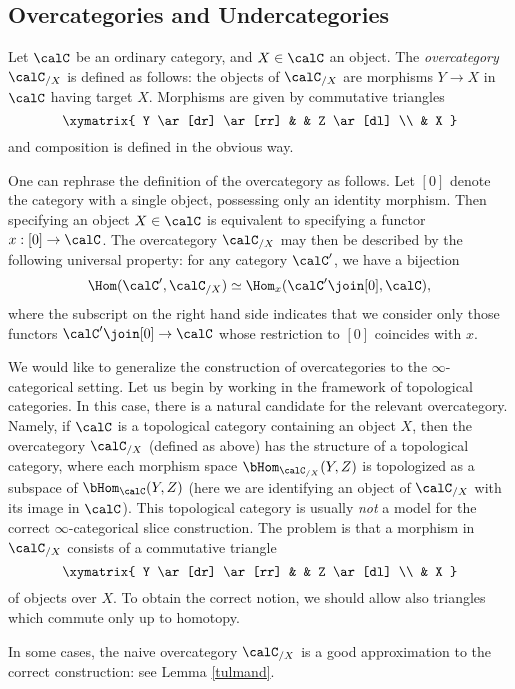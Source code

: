 \subsection{Overcategories and Undercategories}\label{slices}

Let $\calC$ be an ordinary category, and $X \in \calC$ an object.
The {\it overcategory} $\calC_{/X}$ is defined as follows:
the objects of $\calC_{/X}$ are
morphisms $Y \rightarrow X$ in $\calC$ having target $X$.
Morphisms are given by commutative triangles
$$\xymatrix{ Y \ar[dr] \ar[rr] & & Z \ar[dl] \\
& X }$$
and composition is defined in the obvious way.

One can rephrase the definition of the overcategory as follows.
Let $[0]$ denote the category with a single object, possessing
only an identity morphism. Then specifying an object $X \in \calC$
is equivalent to specifying a functor $x: [0] \rightarrow
\calC$. The overcategory $\calC_{/X}$ may then be described by
the following universal property: for any category $\calC'$, we
have a bijection
$$ \Hom(\calC', \calC_{/X}) \simeq \Hom_{x}(\calC' \join [0],
\calC),$$ where the subscript on the right hand side indicates
that we consider only those functors $\calC' \join [0]
\rightarrow \calC$ whose restriction to $[0]$ coincides with
$x$.

We would like to generalize the construction of overcategories to the $\infty$-categorical setting. 
Let us begin by working in the framework of topological categories. In this case, there is a natural candidate for the relevant overcategory. Namely, if $\calC$ is a topological category containing an object $X$, then the overcategory $\calC_{/X}$ (defined as above) has the structure of a topological category, where each morphism space $\bHom_{ \calC_{/X} }(Y,Z)$ is topologized as a subspace
of $\bHom_{\calC}(Y,Z)$ (here we are identifying an object of $\calC_{/X}$ with its image in $\calC$). This topological category is usually {\em
not} a model for the correct $\infty$-categorical slice
construction. The problem is that a morphism in $\calC_{/X}$ consists
of a commutative triangle
$$\xymatrix{ Y \ar[dr] \ar[rr] & & Z \ar[dl] \\
& X }$$
of objects over $X$. To obtain the correct notion, we should allow also
triangles which commute only up to homotopy. 

\begin{remark}
In some cases, the naive overcategory $\calC_{/X}$ is a good approximation
to the correct construction: see Lemma \ref{tulmand}.
\end{remark}

